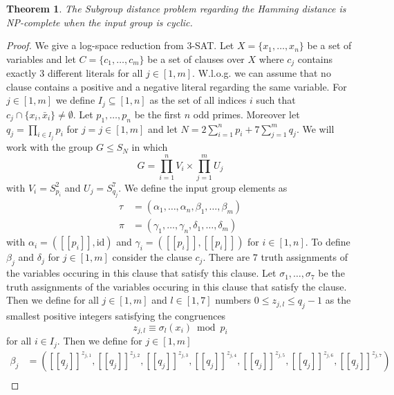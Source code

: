 \documentclass{article}
\newtheorem{theorem}{Theorem}
\newcommand{\llbracket}{[\![}
\newcommand{\rrbracket}{]\!]}
\begin{document}
\begin{theorem}
The {\sc Subgroup distance problem} regarding the Hamming distance is {\sf NP}-complete when the input group is cyclic.
\end{theorem}
\begin{proof}
We give a log-space reduction from \textsc{3-SAT}. Let $X = \{x_1,\dots,x_n\}$ be a set of variables and let $C = \{c_1,\dots,c_m\}$ be a set of clauses over $X$ where $c_j$ contains exactly $3$ different literals for all $j \in [1,m]$. W.l.o.g. we can assume that no clause contains a positive and a negative literal regarding the same variable. For $j \in [1,m]$ we define $I_j \subseteq [1,n]$ as the set of all indices $i$ such that $c_j \cap \{x_i,\bar{x}_i\} \neq \emptyset$. Let $p_1,\dots,p_n$ be the first $n$ odd primes. Moreover let $q_j = \prod_{i \in I_j} p_i$ for $j=j \in [1,m]$ and let $N = 2\sum_{i=1}^n p_i + 7\sum_{j=1}^m q_j$. We will work with the group $G \leq S_N$ in which
\begin{displaymath}
G = \prod_{i=1}^n V_i \times \prod_{j=1}^m U_j
\end{displaymath}
with $V_i = S_{p_i}^2$ and $U_j = S_{q_j}^7$. We define the input group elements as
\begin{align*}
\tau&= (\alpha_1,\dots,\alpha_n, \beta_1,\dots,\beta_m)\\
\pi&= (\gamma_1,\dots,\gamma_n,\delta_1,\dots,\delta_m)
\end{align*}
with $\alpha_i = (\llbracket p_i \rrbracket, \mathrm{id})$ and $\gamma_i = (\llbracket p_i \rrbracket, \llbracket p_i \rrbracket)$ for $i \in [1,n]$. To define $\beta_j$ and $\delta_j$ for $j \in [1,m]$ consider the clause $c_j$. There are $7$ truth assignments of the variables occuring in this clause that satisfy this clause. Let $\sigma_1,\dots,\sigma_7$ be the truth assignments of the variables occuring in this clause that satisfy the clause. Then we define for all $j \in [1,m]$ and $l \in [1,7]$ numbers $0 \leq z_{j,l} \leq q_j-1$ as the smallest positive integers satisfying the congruences
\begin{displaymath}
z_{j,l} \equiv \sigma_l(x_i) \bmod p_i
\end{displaymath}
for all $i \in I_j$. Then we define for $j \in [1,m]$
\begin{align*}
\beta_j&=(\llbracket  q_j \rrbracket^{z_{j,1}}, \llbracket  q_j \rrbracket^{z_{j,2}}, \llbracket  q_j \rrbracket^{z_{j,3}}, \llbracket  q_j \rrbracket^{z_{j,4}}, \llbracket  q_j \rrbracket^{z_{j,5}}, \llbracket  q_j \rrbracket^{z_{j,6}}, \llbracket  q_j \rrbracket^{z_{j,7}})\\

\end{align*}
\end{proof}
\end{document}

